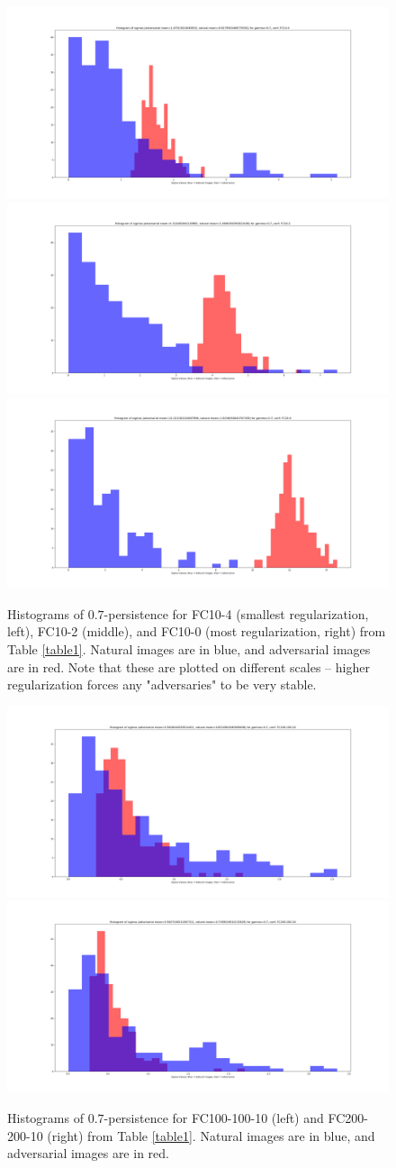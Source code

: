 \begin{figure}[!htb]
\centering
\includegraphics[trim=200 80 100 100, clip,width=.32\textwidth]{c2_figures/FC10-4-gamma1_hist.png}
\includegraphics[trim=200 80 100 100, clip,width=.32\textwidth]{c2_figures/FC10-2-gamma1_hist.png}
\includegraphics[trim=200 80 100 100, clip,width=.32\textwidth]{c2_figures/FC10-0-gamma1_hist.png}
\caption{Histograms of $0.7$-persistence for FC10-4 (smallest regularization, left), FC10-2 (middle), and FC10-0 (most regularization, right) from Table \ref{table1}. Natural images are in blue, and adversarial images are in red. Note that these are plotted on different scales -- higher regularization forces any "adversaries" to be very stable.\vspace{2em} }
\label{fig:FC10}
\end{figure}

\begin{figure}[!htb]
\centering
\includegraphics[trim=200 80 100 100, clip,width=.49\textwidth]{c2_figures/FC100-100-10-gamma1_hist.png}
\includegraphics[trim=200 80 100 100, clip,width=.49\textwidth]{c2_figures/FC200-200-10-gamma1_hist.png}
\caption{Histograms of $0.7$-persistence for FC100-100-10 (left) and FC200-200-10 (right) from Table \ref{table1}. Natural images are in blue, and adversarial images are in red.}
\label{fig:FC100200}
\end{figure}

